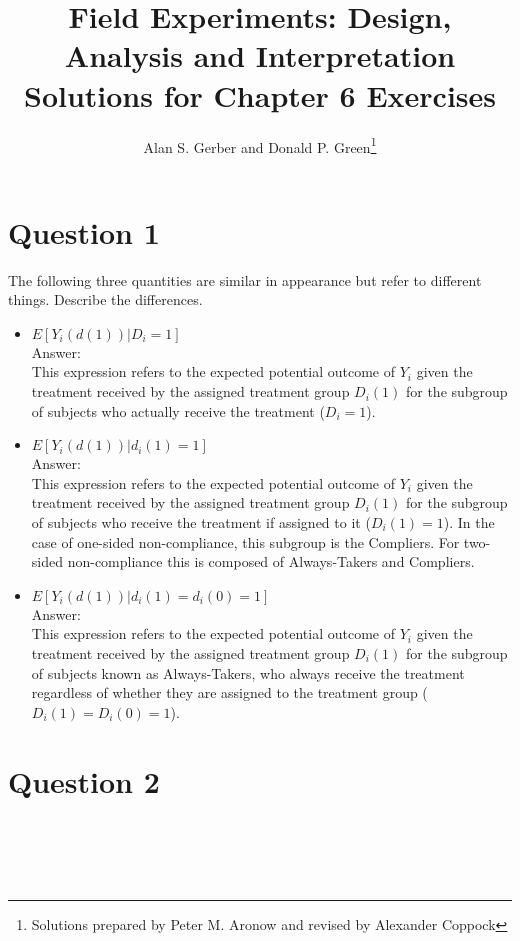 \documentclass[11pt,notitlepage]{article}\usepackage[]{graphicx}\usepackage[]{color}
\title{Field Experiments: Design, Analysis and Interpretation \\
Solutions for Chapter 6 Exercises}
\author{Alan S. Gerber and Donald P. Green\footnote{Solutions prepared by Peter M. Aronow and revised by Alexander Coppock}}
\date{\vspace{-5ex}}
\makeatletter
\newenvironment{kframe}{%
 \def\at@end@of@kframe{}%
 \ifinner\ifhmode%
  \def\at@end@of@kframe{\end{minipage}}%
  \begin{minipage}{\columnwidth}%
 \fi\fi%
 \def\FrameCommand##1{\hskip\@totalleftmargin \hskip-\fboxsep
 \colorbox{shadecolor}{##1}\hskip-\fboxsep
     \hskip-\linewidth \hskip-\@totalleftmargin \hskip\columnwidth}%
 \MakeFramed {\advance\hsize-\width
   \@totalleftmargin\z@ \linewidth\hsize
   \@setminipage}}%
 {\par\unskip\endMakeFramed%
 \at@end@of@kframe}
\newenvironment{knitrout}{}{} %
\makeatother
\begin{document}
\maketitle


\section*{Question 1}
The following three quantities are similar in appearance but refer to different things. Describe the differences.
\begin{itemize}
\item $E[Y_i(d(1))|D_i = 1]$ \\
Answer:\\
This expression refers to the expected potential outcome of $Y_i$ given the treatment received by the assigned treatment group $D_i(1)$ for the subgroup of subjects who actually receive the treatment ($D_i=1$).
\item $E[Y_i(d(1))|d_i(1) = 1]$ \\
Answer:\\
This expression refers to the expected potential outcome of $Y_i$ given the treatment received by the assigned treatment group $D_i(1)$ for the subgroup of subjects who receive the treatment if assigned to it ($D_i(1)=1$). In the case of one-sided non-compliance, this subgroup is the Compliers. For two-sided non-compliance this is composed of Always-Takers and Compliers.
\item $E[Y_i(d(1))|d_i(1) = d_i(0) = 1]$\\
Answer:\\
This expression refers to the expected potential outcome of $Y_i$ given the treatment received by the assigned treatment group $D_i (1)$ for the subgroup of subjects known as Always-Takers, who always receive the treatment regardless of whether they are assigned to the treatment group ($D_i (1)=D_i (0)=1$). 

\end{itemize}

\section*{Question 2}
\begin{knitrout}
\color{fgcolor}\begin{kframe}
\begin{verbatim}





\end{verbatim}
\end{kframe}
\end{knitrout}
\end{document}
